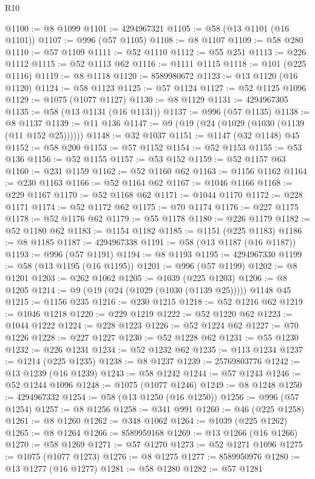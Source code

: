 \begin{lexlean}{R10}
\begin{coremodule}
@1100 := @8 @1099
@1101 := 4294967321
@1105 := @58 (@13 @1101 (@16 @1101))
@1107 := @996 (@57 @1105)
@1108 := @8 @1107
@1109 := @58 @280
@1110 := @57 @1109
@1111 := @52 @1110
@1112 := @55 @251
@1113 := @226 @1112
@1115 := @52 @1113 @62
@1116 := @1111 @1115
@1118 := @101 (@225 @1116)
@1119 := @8 @1118
@1120 := 8589980672
@1123 := @13 @1120 (@16 @1120)
@1124 := @58 @1123
@1125 := @57 @1124
@1127 := @52 @1125 @1096
@1129 := @1075 (@1077 @1127)
@1130 := @8 @1129
@1131 := 4294967305
@1135 := @58 (@13 @1131 (@16 @1131))
@1137 := @996 (@57 @1135)
@1138 := @8 @1137
@1139 := @11 @136
@1147 := @9 (@19 (@24 (@1029 (@1030 (@1139 (@11 @152 @25))))))
@1148 := @32 @1037
@1151 := @1147 (@32 @1148) @45
@1152 := @58 @200
@1153 := @57 @1152
@1154 := @52 @1153
@1155 := @53 @136
@1156 := @52 @1155
@1157 := @53 @152
@1159 := @52 @1157 @63
@1160 := @231 @1159
@1162 := @52 @1160 @62
@1163 := @1156 @1162
@1164 := @230 @1163
@1166 := @52 @1164 @62
@1167 := @1046 @1166
@1168 := @229 @1167
@1170 := @52 @1168 @62
@1171 := @1044 @1170
@1172 := @228 @1171
@1174 := @52 @1172 @62
@1175 := @70 @1174
@1176 := @227 @1175
@1178 := @52 @1176 @62
@1179 := @55 @1178
@1180 := @226 @1179
@1182 := @52 @1180 @62
@1183 := @1154 @1182
@1185 := @1151 (@225 @1183)
@1186 := @8 @1185
@1187 := 4294967338
@1191 := @58 (@13 @1187 (@16 @1187))
@1193 := @996 (@57 @1191)
@1194 := @8 @1193
@1195 := 4294967330
@1199 := @58 (@13 @1195 (@16 @1195))
@1201 := @996 (@57 @1199)
@1202 := @8 @1201
@1203 := @262 @1062
@1205 := @1039 (@225 @1203)
@1206 := @8 @1205
@1214 := @9 (@19 (@24 (@1029 (@1030 (@1139 @25))))) @1148 @45
@1215 := @1156 @235
@1216 := @230 @1215
@1218 := @52 @1216 @62
@1219 := @1046 @1218
@1220 := @229 @1219
@1222 := @52 @1220 @62
@1223 := @1044 @1222
@1224 := @228 @1223
@1226 := @52 @1224 @62
@1227 := @70 @1226
@1228 := @227 @1227
@1230 := @52 @1228 @62
@1231 := @55 @1230
@1232 := @226 @1231
@1234 := @52 @1232 @62
@1235 := @113 @1234
@1237 := @1214 (@225 @1235)
@1238 := @8 @1237
@1239 := 25769803776
@1242 := @13 @1239 (@16 @1239)
@1243 := @58 @1242
@1244 := @57 @1243
@1246 := @52 @1244 @1096
@1248 := @1075 (@1077 @1246)
@1249 := @8 @1248
@1250 := 4294967332
@1254 := @58 (@13 @1250 (@16 @1250))
@1256 := @996 (@57 @1254)
@1257 := @8 @1256
@1258 := @341 @991
@1260 := @46 (@225 @1258)
@1261 := @8 @1260
@1262 := @348 @1062
@1264 := @1039 (@225 @1262)
@1265 := @8 @1264
@1266 := 8589959168
@1269 := @13 @1266 (@16 @1266)
@1270 := @58 @1269
@1271 := @57 @1270
@1273 := @52 @1271 @1096
@1275 := @1075 (@1077 @1273)
@1276 := @8 @1275
@1277 := 8589950976
@1280 := @13 @1277 (@16 @1277)
@1281 := @58 @1280
@1282 := @57 @1281

\end{coremodule}
\end{lexlean}

